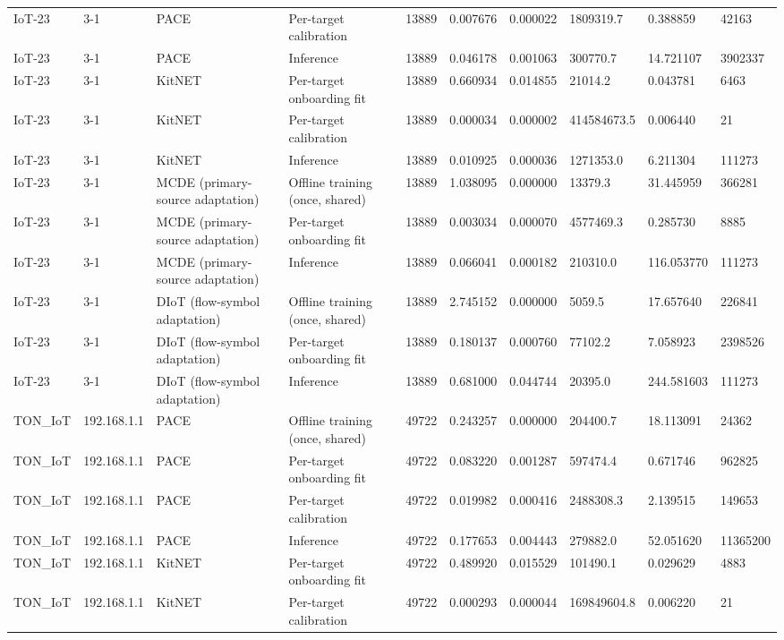 \begin{tabular}{llllllllll}
IoT-23 & 3-1 & PACE & Per-target calibration & 13889 & 0.007676 & 0.000022 & 1809319.7 & 0.388859 & 42163 \\
IoT-23 & 3-1 & PACE & Inference & 13889 & 0.046178 & 0.001063 & 300770.7 & 14.721107 & 3902337 \\
IoT-23 & 3-1 & KitNET & Per-target onboarding fit & 13889 & 0.660934 & 0.014855 & 21014.2 & 0.043781 & 6463 \\
IoT-23 & 3-1 & KitNET & Per-target calibration & 13889 & 0.000034 & 0.000002 & 414584673.5 & 0.006440 & 21 \\
IoT-23 & 3-1 & KitNET & Inference & 13889 & 0.010925 & 0.000036 & 1271353.0 & 6.211304 & 111273 \\
IoT-23 & 3-1 & MCDE (primary-source adaptation) & Offline training (once, shared) & 13889 & 1.038095 & 0.000000 & 13379.3 & 31.445959 & 366281 \\
IoT-23 & 3-1 & MCDE (primary-source adaptation) & Per-target onboarding fit & 13889 & 0.003034 & 0.000070 & 4577469.3 & 0.285730 & 8885 \\
IoT-23 & 3-1 & MCDE (primary-source adaptation) & Inference & 13889 & 0.066041 & 0.000182 & 210310.0 & 116.053770 & 111273 \\
IoT-23 & 3-1 & DIoT (flow-symbol adaptation) & Offline training (once, shared) & 13889 & 2.745152 & 0.000000 & 5059.5 & 17.657640 & 226841 \\
IoT-23 & 3-1 & DIoT (flow-symbol adaptation) & Per-target onboarding fit & 13889 & 0.180137 & 0.000760 & 77102.2 & 7.058923 & 2398526 \\
IoT-23 & 3-1 & DIoT (flow-symbol adaptation) & Inference & 13889 & 0.681000 & 0.044744 & 20395.0 & 244.581603 & 111273 \\
TON\_IoT & 192.168.1.1 & PACE & Offline training (once, shared) & 49722 & 0.243257 & 0.000000 & 204400.7 & 18.113091 & 24362 \\
TON\_IoT & 192.168.1.1 & PACE & Per-target onboarding fit & 49722 & 0.083220 & 0.001287 & 597474.4 & 0.671746 & 962825 \\
TON\_IoT & 192.168.1.1 & PACE & Per-target calibration & 49722 & 0.019982 & 0.000416 & 2488308.3 & 2.139515 & 149653 \\
TON\_IoT & 192.168.1.1 & PACE & Inference & 49722 & 0.177653 & 0.004443 & 279882.0 & 52.051620 & 11365200 \\
TON\_IoT & 192.168.1.1 & KitNET & Per-target onboarding fit & 49722 & 0.489920 & 0.015529 & 101490.1 & 0.029629 & 4883 \\
TON\_IoT & 192.168.1.1 & KitNET & Per-target calibration & 49722 & 0.000293 & 0.000044 & 169849604.8 & 0.006220 & 21 \\

\end{tabular}
